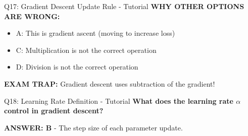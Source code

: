\documentclass[8pt]{beamer}
\begin{document}
\begin{frame}{Q17: Gradient Descent Update Rule - Tutorial}
		\vspace{0.05cm}
		\textcolor{myred}{\textbf{WHY OTHER OPTIONS ARE WRONG:}}
		\begin{itemize}
			\item \textcolor{myred}{A:} This is gradient ascent (moving to increase loss)
			\item \textcolor{myred}{C:} Multiplication is not the correct operation
			\item \textcolor{myred}{D:} Division is not the correct operation
		\end{itemize}
		
		\textcolor{myred}{\textbf{EXAM TRAP:}} Gradient descent uses \textcolor{myblue}{subtraction} of the gradient!
	\end{frame}
	
	\begin{frame}{Q18: Learning Rate Definition - Tutorial}
		\fontsize{6.5}{7.5}\selectfont
		\textbf{What does the learning rate $\alpha$ control in gradient descent?}
		
		\vspace{0.05cm}
		\textcolor{myblue}{\textbf{ANSWER: B}} - The step size of each parameter update.
		

\end{frame}
\end{document}
